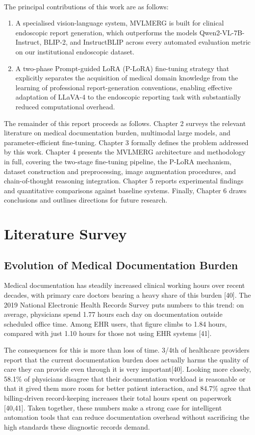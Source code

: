 ﻿﻿\documentclass[12pt]{report}
\begin{document}
The principal contributions of this work are as follows:
\begin{enumerate}
\item A specialised vision-language system, MVLMERG is built for clinical endoscopic report generation, which outperforms the models Qwen2-VL-7B-Instruct, BLIP-2, and InstructBLIP across every automated evaluation metric on our institutional endoscopic dataset.
\item A two-phase Prompt-guided LoRA (P-LoRA) fine-tuning strategy that explicitly separates the acquisition of medical domain knowledge from the learning of professional report-generation conventions, enabling effective adaptation of LLaVA-4 to the endoscopic reporting task with substantially reduced computational overhead.
\end{enumerate}
The remainder of this report proceeds as follows. Chapter 2 surveys the relevant literature on medical documentation burden, multimodal large models, and parameter-efficient fine-tuning. Chapter 3 formally defines the problem addressed by this work. Chapter 4 presents the MVLMERG architecture and methodology in full, covering the two-stage fine-tuning pipeline, the P-LoRA mechanism, dataset construction and preprocessing, image augmentation procedures, and chain-of-thought reasoning integration. Chapter 5 reports experimental findings and quantitative comparisons against baseline systems. Finally, Chapter 6 draws conclusions and outlines directions for future research.

\chapter{Literature Survey}
\section{Evolution of Medical Documentation Burden}
Medical documentation has steadily increased clinical working hours over recent decades, with primary care doctors bearing a heavy share of this burden [40]. The 2019 National Electronic Health Records Survey puts numbers to this trend: on average, physicians spend 1.77 hours each day on documentation outside scheduled office time. Among EHR users, that figure climbs to 1.84 hours, compared with just 1.10 hours for those not using EHR systems [41].

The consequences for this is more than loss of time. 3/4th of healthcare providers report that the current documentation burden does actually harms the quality of care they can provide even through it is very important[40]. Looking more closely, 58.1\% of physicians disagree that their documentation workload is reasonable or that it gived them more room for better patient interaction, and 84.7\% agree that billing-driven record-keeping increases their total hours spent on paperwork [40,41]. Taken together, these numbers make a strong case for intelligent automation tools that can reduce documentation overhead without sacrificing the high standards these diagnostic records demand.
\end{document}
